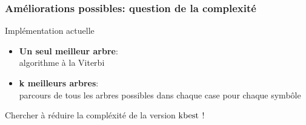 \documentclass{beamer}
\begin{document}
\begin{frame}
\frametitle{Am\'eliorations possibles: question de la complexit\'e}

\begin{block}{Impl\'ementation actuelle}
\begin{itemize}
\item \textbf{Un seul meilleur arbre}:
\\
algorithme \`a la Viterbi
\item \textbf{k meilleurs arbres}:
\\ parcours de tous les arbres possibles dans chaque case pour chaque symb\^ole
\end{itemize}
\end{block}

\pause

Chercher \`a r\'eduire la compl\'exit\'e de la version $\mathrm{k\-best}$ !

\end{frame}

\end{document}
